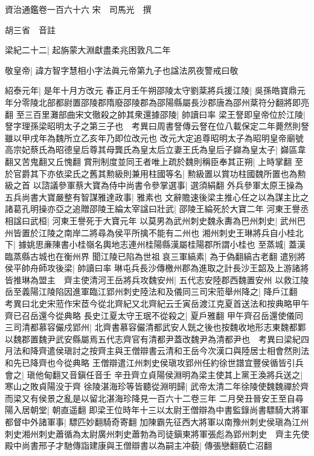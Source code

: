 資治通鑑卷一百六十六
宋　司馬光　撰

胡三省　音註

梁紀二十二|{
	起旃蒙大淵獻盡柔兆困敦凡二年}


敬皇帝|{
	諱方智字慧相小字法眞元帝第九子也諡法夙夜警戒曰敬}


紹泰元年|{
	是年十月方改元}
春正月壬午朔邵陵太守劉棻將兵援江陵|{
	吳孫皓寶鼎元年分零陵北部都尉置邵陵郡隋廢邵陵郡為邵陽縣屬長沙郡唐為邵州棻符分翻將即亮翻}
至三百里灘部曲宋文徹殺之帥其衆還據邵陵|{
	帥讀曰率}
梁王詧即皇帝位於江陵|{
	詧字理孫梁昭明太子之第三子也　考異曰周書詧傳云詧在位八載保定二年薨然則詧雖以甲戌年為魏所立乙亥年乃即位改元也}
改元大定追尊昭明太子為昭明皇帝廟號高宗妃蔡氏為昭德皇后尊其母龔氏為皇太后立妻王氏為皇后子巋為皇太子|{
	巋區韋翻又苦鬼翻又丘愧翻}
賞刑制度並同王者唯上疏於魏則稱臣奉其正朔|{
	上時掌翻}
至於官爵其下亦依梁氏之舊其勲級則兼用柱國等名|{
	勲級置以賞功柱國魏所置也為勲級之首}
以諮議參軍蔡大寶為侍中尚書令參掌選事|{
	選須絹翻}
外兵參軍太原王操為五兵尚書大寶嚴整有智謀雅達政事|{
	雅素也}
文辭贍速後梁主推心任之以為謀主比之諸葛孔明操亦亞之追贈邵陵王綸太宰諡曰壯武|{
	邵陵王綸死於大寶二年}
河東王譽丞相諡曰武桓|{
	河東王譽死于大寶元年}
以莫男為武州刺史魏永夀為巴州刺史|{
	武州巴州皆置於江陵之南岸二將尋為侯平所擒不能有二州也}
湘州刺史王琳將兵自小桂北下|{
	據姚思亷陳書小桂嶺名輿地志連州桂陽縣漢屬桂陽郡所謂小桂也}
至蒸城|{
	蓋漢臨蒸縣古城也在衡州界}
聞江陵已陷為世祖哀三軍縞素|{
	為于偽翻縞古老翻}
遣别將侯平帥舟師攻後梁|{
	帥讀曰率}
琳屯兵長沙傳檄州郡為進取之計長沙王韶及上游諸將皆推琳為盟主　齊主使清河王岳將兵攻魏安州|{
	五代志安陸郡西魏置安州}
以救江陵岳至義陽江陵陷因進軍臨江郢州刺史陸法和及儀同三司宋蒞舉州降之|{
	降戶江翻　考異曰北史宋蒞作宋茝今從北齊紀又北齊紀云壬寅岳渡江克夏首送法和按典略甲午齊已召岳還今從典略}
長史江夏太守王珉不從殺之|{
	夏戶雅翻}
甲午齊召岳還使儀同三司清都慕容儼戍郢州|{
	北齊書慕容儼清都武安人皝之後也按魏收地形志東魏都鄴以魏郡置魏尹武安縣屬焉五代志齊官有清都尹蓋改魏尹為清都尹也　考異曰梁紀四月法和降齊遣侯瑱討之按齊主與王僧辯書云清和王岳今次漢口與陸居士相會然則法和先已降齊也今從典略}
王僧辯遣江州刺史侯瑱攻郢州任約徐世譜宜豐侯循皆引兵會之|{
	瑱他甸翻又音鎭任音壬}
辛丑齊立貞陽侯淵明為梁主使其上黨王渙將兵送之|{
	寒山之敗貞陽没于齊}
徐陵湛海珍等皆聽從淵明歸|{
	武帝太清二年徐陵使魏魏禪於齊而梁又有侯景之亂是以留北湛海珍降見一百六十二卷三年}
二月癸丑晉安王至自尋陽入居朝堂|{
	朝直遥翻}
即梁王位時年十三以太尉王僧辯為中書監錄尚書驃騎大將軍都督中外諸軍事|{
	驃匹妙翻騎奇寄翻}
加陳霸先征西大將軍以南豫州刺史侯瑱為江州刺史湘州刺史蕭循為太尉廣州刺史蕭勃為司徒鎭東將軍張彪為郢州刺史　齊主先使殿中尚書邢子才馳傳詣建康與王僧辯書以為嗣主冲藐|{
	傳張戀翻藐亡沼翻}
